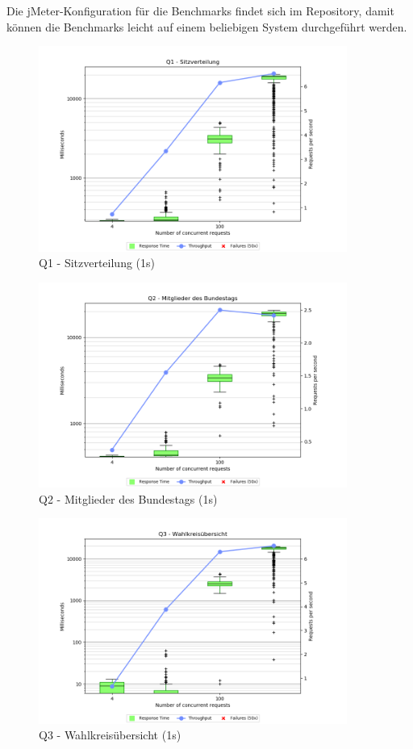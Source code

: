 \documentclass[a4paper]{scrreprt}
\begin{document}
Die jMeter-Konfiguration für die Benchmarks findet sich im Repository, damit können die Benchmarks leicht auf einem beliebigen System durchgeführt werden.

\begin{figure}[htb!]
	\centering
	\includegraphics[width=0.9\textwidth]{images/plots_1s/Q1}
	\caption {Q1 - Sitzverteilung (1s)}
\end{figure}

\begin{figure}[htb!]
	\centering
	\includegraphics[width=0.9\textwidth]{images/plots_1s/Q2}
	\caption {Q2 - Mitglieder des Bundestags (1s)}
\end{figure}

\begin{figure}[htb!]
	\centering
	\includegraphics[width=0.9\textwidth]{images/plots_1s/Q3}
	\caption {Q3 - Wahlkreisübersicht (1s)}
\end{figure}
\end{document}

